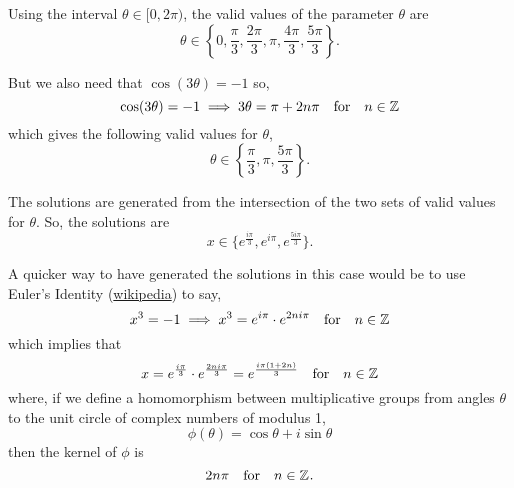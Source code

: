 \documentclass[../MathsNotesBase.tex]{subfiles}
\begin{document}
{\begin{exe}
{				Using the interval ${ \theta \in [0, 2\pi) }$, the valid values of the parameter $\theta$ are 
				\[ \theta \in \left\{ 0, \frac{\pi}{3}, \frac{2\pi}{3}, \pi, \frac{4\pi}{3}, \frac{5\pi}{3} \right\}. \]
				
				But we also need that ${ \cos(3\theta) = -1 }$ so,
				\[ \cos(3\theta) = -1 \implies 3\theta = \pi + 2n\pi \hspace{10pt}\text{for}\hspace{10pt} n \in \mathbb{Z}^{} \]
				which gives the following valid values for $\theta$,
				\[ \theta \in \left\{ \frac{\pi}{3}, \pi, \frac{5\pi}{3} \right\}. \]
				
				The solutions are generated from the intersection of the two sets of valid values for $\theta$. So, the solutions are
				\[ x \in \{ e^{\frac{i\pi}{3}}, e^{i\pi}, e^{\frac{5i\pi}{3}} \}. \]
				
				A quicker way to have generated the solutions in this case would be to use Euler's Identity (\href{https://en.wikipedia.org/wiki/Euler\%27s_identity}{wikipedia}) to say,
				\[ x^3 = -1 \implies x^3 = e^{i\pi}  \cdot e^{2ni\pi} \hspace{10pt}\text{for}\hspace{10pt} n \in \mathbb{Z}^{} \]
				which implies that
				\[ x = e^{\frac{i\pi}{3}} \cdot e^{\frac{2ni\pi}{3}} = e^{\frac{i\pi(1 + 2n)}{3}} \hspace{10pt}\text{for}\hspace{10pt} n \in \mathbb{Z}^{}  \]
				where, if we define a homomorphism between multiplicative groups from angles $\theta$ to the unit circle of complex numbers of modulus 1,
				\[ \phi(\theta) = \cos\theta + i \sin\theta \]
				then the kernel of $\phi$ is
				\[ 2n\pi \hspace{10pt}\text{for}\hspace{10pt} n \in \mathbb{Z}^{}. \]
			}
			\biggerskip
		\end{exe}
	}
	
	\biggerskip
\end{document}
